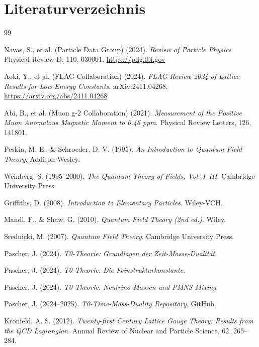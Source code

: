 	\section{Literaturverzeichnis}
	
	\begin{thebibliography}{99}
		
		Navas, S., et al. (Particle Data Group) (2024). 
		\textit{Review of Particle Physics}. 
		Physical Review D, 110, 030001.
		\url{https://pdg.lbl.gov}
		
		Aoki, Y., et al. (FLAG Collaboration) (2024). 
		\textit{FLAG Review 2024 of Lattice Results for Low-Energy Constants}. 
		arXiv:2411.04268.
		\url{https://arxiv.org/abs/2411.04268}
		
		Abi, B., et al. (Muon g-2 Collaboration) (2021). 
		\textit{Measurement of the Positive Muon Anomalous Magnetic Moment to 0.46 ppm}. 
		Physical Review Letters, 126, 141801.
		
		Peskin, M. E., \& Schroeder, D. V. (1995). 
		\textit{An Introduction to Quantum Field Theory}. 
		Addison-Wesley.
		
		Weinberg, S. (1995--2000). 
		\textit{The Quantum Theory of Fields, Vol. I--III}. 
		Cambridge University Press.
		
		Griffiths, D. (2008). 
		\textit{Introduction to Elementary Particles}. 
		Wiley-VCH.
		
		Mandl, F., \& Shaw, G. (2010). 
		\textit{Quantum Field Theory (2nd ed.)}. 
		Wiley.
		
		Srednicki, M. (2007). 
		\textit{Quantum Field Theory}. 
		Cambridge University Press.
		
		Pascher, J. (2024). 
		\textit{T0-Theorie: Grundlagen der Zeit-Masse-Dualität}. 

		Pascher, J. (2024). 
		\textit{T0-Theorie: Die Feinstrukturkonstante}. 

		Pascher, J. (2024). 
		\textit{T0-Theorie: Neutrino-Massen und PMNS-Mixing}. 

		Pascher, J. (2024--2025). 
		\textit{T0-Time-Mass-Duality Repository}. 
		GitHub.

		Kronfeld, A. S. (2012). 
		\textit{Twenty-first Century Lattice Gauge Theory: Results from the QCD Lagrangian}. 
		Annual Review of Nuclear and Particle Science, 62, 265--284.
		

\end{thebibliography}
